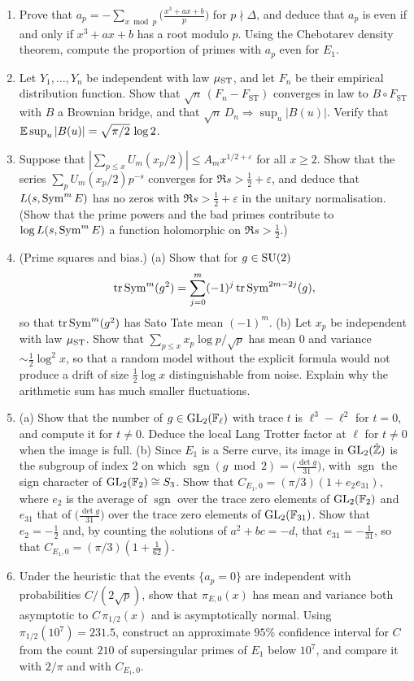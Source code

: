 \begin{enumerate}
\item Prove that $a_p = -\sum_{x\bmod p}\bigl(\frac{x^3+ax+b}{p}\bigr)$ for $p\nmid\Delta$, and deduce that $a_p$ is even if and only if $x^3+ax+b$ has a root modulo $p$. Using the Chebotarev density theorem, compute the proportion of primes with $a_p$ even for $E_1$.
\item Let $Y_1,\dots,Y_n$ be independent with law $\mu_{\mathrm{ST}}$, and let $F_n$ be their empirical distribution function. Show that $\sqrt n\,(F_n - F_{\mathrm{ST}})$ converges in law to $B\circ F_{\mathrm{ST}}$ with $B$ a Brownian bridge, and that $\sqrt n\,D_n\Rightarrow\sup_u|B(u)|$. Verify that $\mathbb{E}\sup_u|B(u)| = \sqrt{\pi/2}\,\log2$.
\item Suppose that $|\sum_{p\le x}U_m(x_p/2)| \le A_m x^{1/2+\varepsilon}$ for all $x\ge2$. Show that the series $\sum_pU_m(x_p/2)p^{-s}$ converges for $\Re s > \frac12+\varepsilon$, and deduce that $L(s,\operatorname{Sym}^mE)$ has no zeros with $\Re s > \frac12 + \varepsilon$ in the unitary normalisation. (Show that the prime powers and the bad primes contribute to $\log L(s,\operatorname{Sym}^mE)$ a function holomorphic on $\Re s>\frac12$.)
\item (Prime squares and bias.) (a) Show that for $g\in\mathrm{SU}(2)$
\[
\operatorname{tr}\operatorname{Sym}^m(g^2) = \sum_{j=0}^m(-1)^j\operatorname{tr}\operatorname{Sym}^{2m-2j}(g),
\]
so that $\operatorname{tr}\operatorname{Sym}^m(g^2)$ has Sato Tate mean $(-1)^m$. (b) Let $x_p$ be independent with law $\mu_{\mathrm{ST}}$. Show that $\sum_{p\le x}x_p\log p/\sqrt p$ has mean $0$ and variance $\sim\frac12\log^2x$, so that a random model without the explicit formula would not produce a drift of size $\frac12\log x$ distinguishable from noise. Explain why the arithmetic sum has much smaller fluctuations.
\item (a) Show that the number of $g\in\mathrm{GL}_2(\mathbb{F}_\ell)$ with trace $t$ is $\ell^3 - \ell^2$ for $t = 0$, and compute it for $t \ne 0$. Deduce the local Lang Trotter factor at $\ell$ for $t\ne0$ when the image is full. (b) Since $E_1$ is a Serre curve, its image in $\mathrm{GL}_2(\hat{\mathbb{Z}})$ is the subgroup of index $2$ on which $\operatorname{sgn}(g\bmod2) = \bigl(\frac{\det g}{31}\bigr)$, with $\operatorname{sgn}$ the sign character of $\mathrm{GL}_2(\mathbb{F}_2)\cong S_3$. Show that $C_{E_1,0} = (\pi/3)(1 + e_2e_{31})$, where $e_2$ is the average of $\operatorname{sgn}$ over the trace zero elements of $\mathrm{GL}_2(\mathbb{F}_2)$ and $e_{31}$ that of $\bigl(\frac{\det g}{31}\bigr)$ over the trace zero elements of $\mathrm{GL}_2(\mathbb{F}_{31})$. Show that $e_2 = -\frac12$ and, by counting the solutions of $a^2+bc = -d$, that $e_{31} = -\frac1{31}$, so that $C_{E_1,0} = (\pi/3)(1 + \frac1{62})$.
\item Under the heuristic that the events $\{a_p = 0\}$ are independent with probabilities $C/(2\sqrt p)$, show that $\pi_{E,0}(x)$ has mean and variance both asymptotic to $C\,\pi_{1/2}(x)$ and is asymptotically normal. Using $\pi_{1/2}(10^7) = 231.5$, construct an approximate $95\%$ confidence interval for $C$ from the count $210$ of supersingular primes of $E_1$ below $10^7$, and compare it with $2/\pi$ and with $C_{E_1,0}$.
\end{enumerate}

